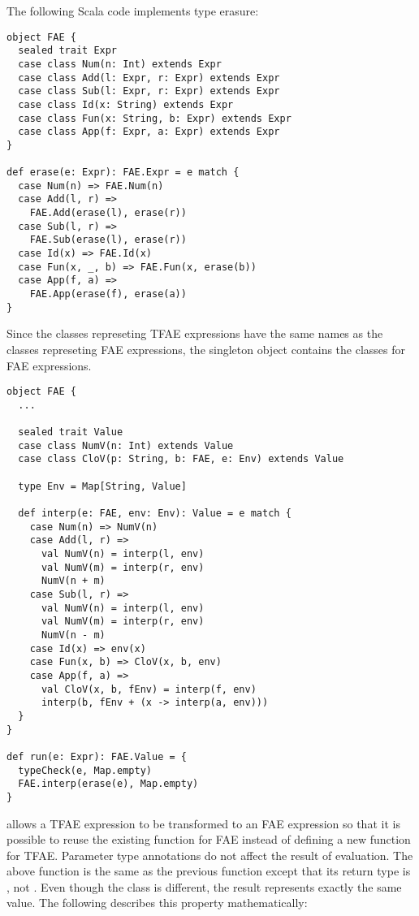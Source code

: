 The following Scala code implements type erasure:

\begin{verbatim}
object FAE {
  sealed trait Expr
  case class Num(n: Int) extends Expr
  case class Add(l: Expr, r: Expr) extends Expr
  case class Sub(l: Expr, r: Expr) extends Expr
  case class Id(x: String) extends Expr
  case class Fun(x: String, b: Expr) extends Expr
  case class App(f: Expr, a: Expr) extends Expr
}

def erase(e: Expr): FAE.Expr = e match {
  case Num(n) => FAE.Num(n)
  case Add(l, r) =>
    FAE.Add(erase(l), erase(r))
  case Sub(l, r) =>
    FAE.Sub(erase(l), erase(r))
  case Id(x) => FAE.Id(x)
  case Fun(x, _, b) => FAE.Fun(x, erase(b))
  case App(f, a) =>
    FAE.App(erase(f), erase(a))
}
\end{verbatim}

Since the classes represeting TFAE expressions have the same names as the
classes represeting FAE expressions, the  singleton object contains the
classes for
FAE expressions.

\begin{verbatim}
object FAE {
  ...

  sealed trait Value
  case class NumV(n: Int) extends Value
  case class CloV(p: String, b: FAE, e: Env) extends Value

  type Env = Map[String, Value]

  def interp(e: FAE, env: Env): Value = e match {
    case Num(n) => NumV(n)
    case Add(l, r) =>
      val NumV(n) = interp(l, env)
      val NumV(m) = interp(r, env)
      NumV(n + m)
    case Sub(l, r) =>
      val NumV(n) = interp(l, env)
      val NumV(m) = interp(r, env)
      NumV(n - m)
    case Id(x) => env(x)
    case Fun(x, b) => CloV(x, b, env)
    case App(f, a) =>
      val CloV(x, b, fEnv) = interp(f, env)
      interp(b, fEnv + (x -> interp(a, env)))
  }
}

def run(e: Expr): FAE.Value = {
  typeCheck(e, Map.empty)
  FAE.interp(erase(e), Map.empty)
}
\end{verbatim}

 allows a TFAE expression to be transformed to an FAE expression so
that it is possible to reuse the existing  function for FAE instead
of
defining a new  function for TFAE. Parameter type annotations do not
affect the result of evaluation. The above  function is the same as the
previous  function except that its return type is , not
. Even though the class is different, the result represents exactly
the
same value. The following describes this property mathematically:

